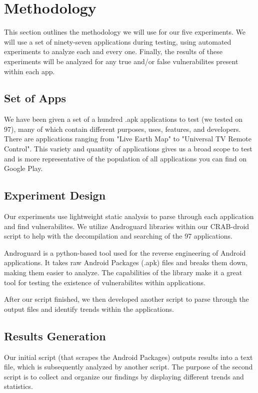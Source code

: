 \section{Methodology}
\label{sec:overview} 

This section outlines the methodology we will use for our five experiments.
We will use a set of ninety-seven applications during testing, using
automated experiments to analyze each and every one. Finally, the results
of these experiments will be analyzed for any true and/or false vulnerabilites
present within each app.

\subsection{Set of Apps}

We have been given a set of a hundred .apk applications to test (we tested on 97), many of 
which contain different purposes, uses, features, and developers. There are 
applications ranging from "Live Earth Map" to "Universal TV Remote Control".
This variety and quantity of applications gives us a broad scope to test and is 
more representative of the population of all applications you can find on 
Google Play.

\subsection{Experiment Design}

Our experiments use lightweight static analysis to parse through each
application and find vulnerabilites. We utilize Androguard libraries within our
CRAB-droid script to help with the decompilation and searching of the 97 applications.

Androguard is a python-based tool used for the reverse engineering of
Android applications. It takes raw Android Packages (.apk) files and breaks
them down, making them easier to analyze. The capabilities of the library make it
a great tool for testing the existence of vulnerabilites within applications.

After our script finished, we then developed another script to parse through the output files and identify
trends within the applications.

\subsection{Results Generation}

Our initial script (that scrapes the Android Packages) outputs results into a text file, 
which is subsequently analyzed by another script. The purpose of the second script is to
collect and organize our findings by displaying different trends and statistics.

